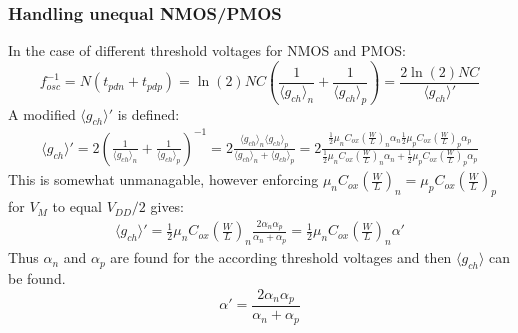 		\subsubsection{Handling unequal NMOS/PMOS}
			In the case of different threshold voltages for NMOS and PMOS:
			\begin{equation}
				f_{osc}^{-1} = N(t_{pdn} + t_{pdp}) = \ln(2)NC\left(\frac{1}{\langle g_{ch}\rangle_n} + \frac{1}{\langle g_{ch}\rangle_p}\right) = \frac{2\ln(2)NC}{\langle g_{ch}\rangle'}
			\end{equation}	
			A modified $\langle g_{ch}\rangle'$ is defined:
			\begin{align}
				\langle g_{ch}\rangle' = 2\left(\frac{1}{\langle g_{ch}\rangle_n} + \frac{1}{\langle g_{ch}\rangle_p}\right)^{-1} = 2\frac{\langle g_{ch}\rangle_n \langle g_{ch}\rangle_p}{\langle g_{ch}\rangle_n + \langle g_{ch}\rangle_p}
				= 2\frac{\frac{1}{2}\mu_nC_{ox}\left(\frac{W}{L}\right)_n \alpha_n\frac{1}{2}\mu_pC_{ox}\left(\frac{W}{L}\right)_p \alpha_p}{\frac{1}{2}\mu_nC_{ox}\left(\frac{W}{L}\right)_n\alpha_n + \frac{1}{2}\mu_pC_{ox}\left(\frac{W}{L}\right)_p\alpha_p}
			\end{align}	
			This is somewhat unmanagable, however enforcing $\mu_nC_{ox}\left(\frac{W}{L}\right)_n = \mu_pC_{ox}\left(\frac{W}{L}\right)_p$ for $V_M$ to equal $V_{DD}/2$ gives:
			\begin{align}
				\langle g_{ch}\rangle' = \frac{1}{2}\mu_nC_{ox}\left(\frac{W}{L}\right)_n\frac{2 \alpha_n\alpha_p}{\alpha_n + \alpha_p} = \frac{1}{2}\mu_nC_{ox}\left(\frac{W}{L}\right)_n \alpha'
			\end{align}	
			Thus $\alpha_n$ and $\alpha_p$ are found for the according threshold voltages and then $\langle g_{ch}\rangle$ can be found.
			\begin{equation}
				\alpha' =  \frac{2 \alpha_n\alpha_p}{\alpha_n + \alpha_p}
			\end{equation}

